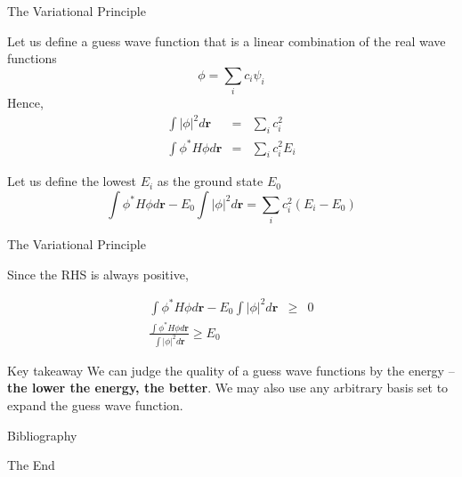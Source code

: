 \documentclass[aspectratio=169]{beamer}
\let \vec \mathbf
\begin{document}
    \begin{frame}{The Variational Principle}

        Let us define a guess wave function that is a linear combination of the real wave functions
        \begin{equation*}
            \phi = \sum_i c_i\psi_i
        \end{equation*}
        Hence,
        \begin{eqnarray*}
            \int |\phi|^2 d\vec{r} & = & \sum_i c_i^2\\
            \int \phi^* H \phi d\vec{r} & = & \sum_i c_i^2E_i
        \end{eqnarray*}


        Let us define the lowest $E_i$ as the ground state $E_0$
        \begin{equation*}
            \int \phi^* H \phi d\vec{r} - E_0 \int |\phi|^2 d\vec{r} =  \sum_i c_i^2(E_i-E_0)
        \end{equation*}
    \end{frame}

    \begin{frame}{The Variational Principle}

        Since the RHS is always positive,

        \begin{eqnarray*}
            \int \phi^* H \phi d\vec{r} - E_0 \int |\phi|^2 d\vec{r} & \geq & 0\\
            \frac{\int \phi^* H \phi d\vec{r}}{\int |\phi|^2 d\vec{r}} \geq E_0
        \end{eqnarray*}
        \begin{alertblock}{Key takeaway}
            We can judge the quality of a guess wave functions by the energy – \textbf{the lower the energy, the better}. We may also use any arbitrary basis set to expand the guess wave function.
        \end{alertblock}
    \end{frame}



    \begin{frame}[allowframebreaks]{Bibliography}
        
        
    \end{frame}



    \begin{frame}
        \Huge{\centerline{The End}}
    \end{frame}
\end{document}
